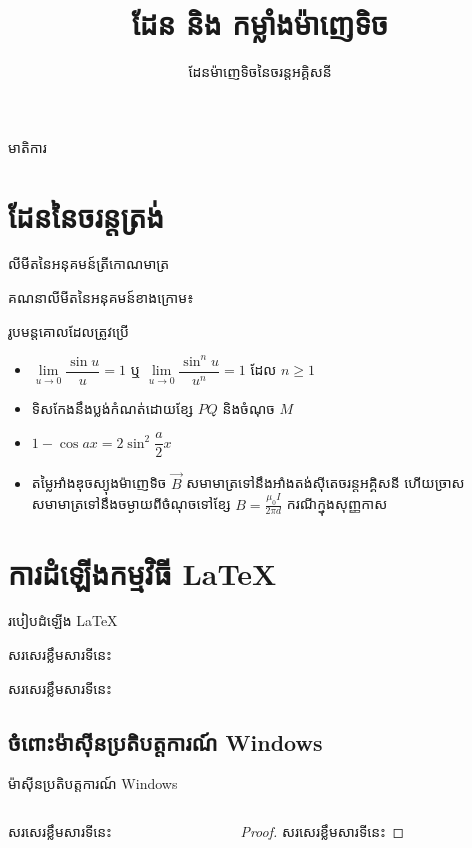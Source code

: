 \documentclass{beamer}
\title{ដែន និង កម្លាំងម៉ាញេទិច}
\author[គ្រូជំនួយ៖ រិទ្ធ ឧត្តម]{ដែនម៉ាញេទិចនៃចរន្តអគ្គិសនី}
\institute{E2stem }
\begin{document}
		\titlepage
	\begin{frame}{មាតិការ}
		\tableofcontents
	\end{frame}
	\section{ដែននៃចរន្តត្រង់}
	\begin{frame}{លីមីតនៃអនុគមន៍ត្រីកោណមាត្រ}
		\begin{block}{គណនាលីមីតនៃអនុគមន៍ខាងក្រោម៖}
		\begin{multicols}{2}
			\begin{enumerate}[a)]
			\end{enumerate}
		\end{multicols}
		\end{block}
		\begin{block}{រូបមន្តគោលដែលត្រូវប្រើ}
			\begin{itemize}
				\item $ \lim\limits_{u\to 0} \dfrac{\sin u}{u}=1$ ឬ $  \lim\limits_{u\to 0} \dfrac{\sin^n u}{u^n}=1 $ ដែល $ n\geq1 $
				\item ទិសកែងនឹងប្លង់កំណត់ដោយខ្សែ $ PQ $  និងចំណុច $ M $
				\item $ 1-\cos ax=2\sin^2 \dfrac{a}{2}x $
				\item តម្លៃអាំងឌុចស្យុងម៉ាញេទិច $ \vec{B}$ សមាមាត្រទៅនឹងអាំងតង់ស៊ីតេចរន្តអគ្គិសនី ហើយច្រាសសមាមាត្រទៅនឹងចម្ងាយពីចំណុចទៅខ្សែ $ B = \frac{\mu_0 I}{2 \pi d} $ ករណីក្នុងសុញ្ញកាស
			\end{itemize}
		\end{block}
\end{frame}
%
	\section{ការដំឡើងកម្មវិធី \LaTeX{}}
	\begin{frame}{របៀបដំឡើង \LaTeX{}}
		\begin{definition}[កម្មវិធី \LaTeX{}]
			សរសេរខ្លឹមសារទីនេះ
		\end{definition}
		\begin{example}[ការណែនាំ]
		សរសេរខ្លឹមសារទីនេះ
		\end{example}
	\end{frame}
		\subsection{ចំពោះម៉ាស៊ីនប្រតិបត្តការណ៍ Windows}
		\begin{frame}{ម៉ាស៊ីនប្រតិបត្តការណ៍ Windows}
			\begin{columns}
				\begin{column}{0.47\textwidth}
					\begin{theorem}
						សរសេរខ្លឹមសារទីនេះ
					\end{theorem}
				\end{column}
				\begin{column}{0.47\textwidth}
					\begin{proof}
						សរសេរខ្លឹមសារទីនេះ
					\end{proof}
				\end{column}
			\end{columns}
		\end{frame}
\end{document}
